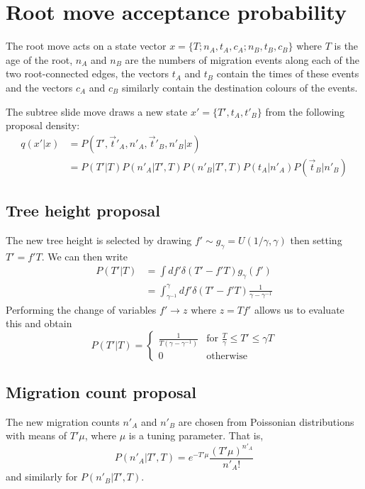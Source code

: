 \documentclass[a4paper, 11pt]{article}
\begin{document}
\section{Root move acceptance probability}

The root move acts on a state vector $x=\{T;n_A,t_A,c_A;n_B,t_B,c_B\}$
where $T$ is the age of the root, $n_A$ and $n_B$ are the numbers of
migration events along each of the two root-connected edges, the
vectors $t_A$ and $t_B$ contain the times of these events and the
vectors $c_A$ and $c_B$ similarly contain the destination colours of
the events.

The subtree slide move draws a new state $x'=\{T',t_A,t'_B\}$
from the following proposal density:
\begin{align}
  q(x'|x) &= P(T',\vec{t}'_A,n'_A,\vec{t}'_B,n'_B|x) \nonumber \\
& = P(T'|T)P(n'_A|T',T)P(n'_B|T',T)P(t_A|n'_A)P(\vec{t}_B|n'_B)
\end{align}

\subsection{Tree height proposal}

The new tree height is selected by drawing $f'\sim g_\gamma=U(1/\gamma,\gamma)$
then setting $T'=f'T$. We can then write
\begin{align}
  P(T'|T)&=\int df'\delta(T'-f'T)g_\gamma(f')\nonumber\\
&=\int_{\gamma^{-1}}^{\gamma}df'\delta(T'-f'T)\frac{1}{\gamma-\gamma^{-1}}
\end{align}
Performing the change of variables $f'\rightarrow z$ where $z=Tf'$
allows us to evaluate this and obtain
\begin{equation}
  P(T'|T)=\left\{\begin{array}{rl}
\frac{1}{T(\gamma-\gamma^{-1})} & \text{for } \frac{T}{\gamma}\leq T' \leq\gamma T\\
0 & \text{otherwise}
\end{array}\right.
\end{equation}

\subsection{Migration count proposal}

The new migration counts $n'_A$ and $n'_B$ are chosen from Poissonian
distributions with means of $T'\mu$, where $\mu$ is a tuning
parameter.  That is,
\begin{equation}
  P(n'_A|T',T)=e^{-T'\mu}\frac{(T'\mu)^{n'_A}}{n'_A!}
\end{equation}
and similarly for $P(n'_B|T',T)$.
\end{document}
